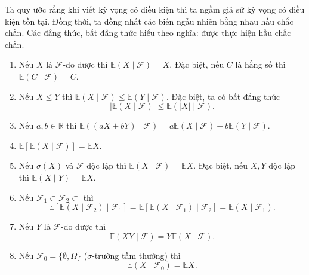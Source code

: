 Ta quy ước rằng khi viết kỳ vọng có điều kiện thì ta ngầm giả sử kỳ vọng có điều kiện tồn tại.
Đồng thời, ta đồng nhất các biến ngẫu nhiên bằng nhau hầu chắc chắn. Các đẳng thức, bất đẳng thức hiểu theo nghĩa: được thực hiện hầu chắc chắn.
\begin{enumerate}
    \item Nếu $X$ là $\mathcal{F}$-đo được thì $\mathbb{E}(X \mid \mathcal{F})=X$. Đặc biệt, nếu $C$ là hằng số thì $\mathbb{E}(C \mid \mathcal{F})=C$.
    \item Nếu $X \leq Y$ thì $\mathbb{E}(X \mid \mathcal{F}) \leq \mathbb{E}(Y \mid \mathcal{F})$. Đặc biệt, ta có bất đẳng thức
    $$
    |\mathbb{E}(X \mid \mathcal{F})| \leq \mathbb{E}(|X| \mid \mathcal{F}).
    $$
    \item Nếu $a, b \in \mathbb{R}$ thì $\mathbb{E}((a X+b Y) \mid \mathcal{F})=a \mathbb{E}(X \mid \mathcal{F})+b \mathbb{E}(Y \mid \mathcal{F})$. \\
    \item $\mathbb{E}[\mathbb{E}(X \mid \mathcal{F})]=\mathbb{E} X$. \\
    \item Nếu $\sigma(X)$ và $\mathcal{F}$ độc lập thì $\mathbb{E}(X \mid \mathcal{F})=\mathbb{E} X$. Đặc biệt, nếu $X, Y$ độc lập thì $\mathbb{E}(X \mid Y)=\mathbb{E} X$.
    \item Nếu $\mathcal{F}_1 \subset \mathcal{F}_2 \subset $ thì
    $$
    \mathbb{E}\left[\mathbb{E}\left(X \mid \mathcal{F}_2\right) \mid \mathcal{F}_1\right]=\mathbb{E}\left[\mathbb{E}\left(X \mid \mathcal{F}_1\right) \mid \mathcal{F}_2\right]=\mathbb{E}\left(X \mid \mathcal{F}_1\right) .
    $$
    \item Nếu $Y$ là $\mathcal{F}$-đo được thì
    $$
    \mathbb{E}(X Y \mid \mathcal{F})=Y \mathbb{E}(X \mid \mathcal{F}).
    $$
    \item Nếu $\mathcal{F}_0=\{\emptyset, \Omega\}$ ($\sigma$-trường tầm thường) thì
    $$
    \mathbb{E}\left(X \mid \mathcal{F}_0\right)=\mathbb{E} X .
    $$
\end{enumerate}
